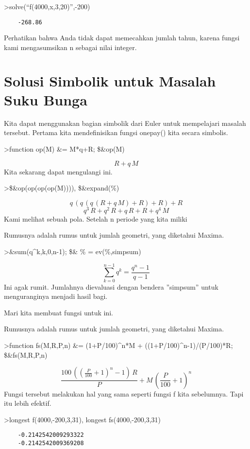 \documentclass[
]{book}
\begin{document}
\textgreater solve(``f(4000,x,3,20)'',-200)

\begin{verbatim}
    -268.86 
\end{verbatim}

Perhatikan bahwa Anda tidak dapat memecahkan jumlah tahun, karena fungsi kami mengasumsikan n sebagai nilai integer.

\section{Solusi Simbolik untuk Masalah Suku Bunga}\label{solusi-simbolik-untuk-masalah-suku-bunga}

Kita dapat menggunakan bagian simbolik dari Euler untuk mempelajari masalah tersebut. Pertama kita mendefinisikan fungsi onepay() kita secara simbolis.

\textgreater function op(M) \&= M*q+R; \$\&op(M)

\[R+q\,M\]Kita sekarang dapat mengulangi ini.

\textgreater\$\&op(op(op(op(M)))), \$\&expand(\%)

\[q\,\left(q\,\left(q\,\left(R+q\,M\right)+R\right)+R\right)+R\]\[q^3\,R+q^2\,R+q\,R+R+q^4\,M\]Kami melihat sebuah pola. Setelah n periode yang kita miliki

Rumusnya adalah rumus untuk jumlah geometri, yang diketahui Maxima.

\textgreater\&sum(q\^{}k,k,0,n-1); \$\& \% = ev(\%,simpsum)

\[\sum_{k=0}^{n-1}{q^{k}}=\frac{q^{n}-1}{q-1}\]Ini agak rumit. Jumlahnya dievaluasi dengan bendera ''simpsum'' untuk menguranginya menjadi hasil bagi.

Mari kita membuat fungsi untuk ini.

Rumusnya adalah rumus untuk jumlah geometri, yang diketahui Maxima.

\textgreater function fs(M,R,P,n) \&= (1+P/100)\^{}n*M + ((1+P/100)\^{}n-1)/(P/100)*R; \$\&fs(M,R,P,n)

\[\frac{100\,\left(\left(\frac{P}{100}+1\right)^{n}-1\right)\,R}{P}+M
 \,\left(\frac{P}{100}+1\right)^{n}\]Fungsi tersebut melakukan hal yang sama seperti fungsi f kita sebelumnya. Tapi itu lebih efektif.

\textgreater longest f(4000,-200,3,31), longest fs(4000,-200,3,31)

\begin{verbatim}
    -0.2142542009293322 
    -0.2142542009369208 
\end{verbatim}
\end{document}
